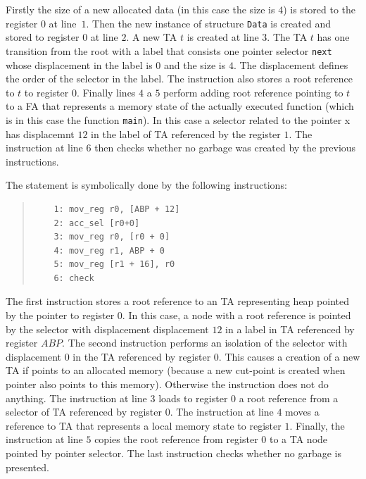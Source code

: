 	Firstly the size of a new allocated data (in this case the size is $4$) is stored to the register $0$ at line~$1$.
	Then the new instance of structure {\tt Data} is created and stored to register $0$ at line $2$.
	A new TA $t$ is created at line $3$.
	The TA $t$ has one transition from the root with a label that consists one pointer selector {\tt next} whose
	displacement in the label is $0$ and the size is $4$.
	The displacement defines the order of the selector in the label.
	The instruction  also stores a root reference to $t$ to register $0$.
	Finally lines $4$ a $5$ perform adding root reference pointing to $t$ to a FA that represents
	a memory state of the actually executed function (which is in this case the function {\tt main}).
	In this case a selector related to the pointer x has displacemnt $12$ in the label of TA referenced by the register $1$.
	The instruction at line $6$ then checks whether no garbage was created by the previous instructions.
\eexmp

\bexmp
	The statement  is symbolically done by the following instructions:
	\begin{quote}
	\begin{verbatim}
	1: mov_reg r0, [ABP + 12]
	2: acc_sel [r0+0]
	3: mov_reg r0, [r0 + 0]
	4: mov_reg r1, ABP + 0
	5: mov_reg [r1 + 16], r0    
	6: check
	\end{verbatim}
	\end{quote}

	The first instruction stores a root reference to an TA representing heap pointed by the  pointer to register $0$.
	In this case, a node with a root reference is pointed by the selector with displacement displacement $12$ in a label in TA referenced by register $ABP$.
	The second instruction performs an isolation of the selector with displacement $0$ in the TA referenced by register $0$.
	This causes a creation of a new TA if  points to an allocated memory (because a new
	cut-point is created when pointer  also points to this memory).
	Otherwise the instruction does not do anything.
	The instruction at line $3$ loads to register $0$ a root reference from a selector of TA referenced by register $0$.
	The instruction at line $4$ moves a reference to TA that represents a local memory state to register $1$.
	Finally, the instruction at line $5$ copies the root reference from register $0$ to
	a TA node pointed by pointer  selector.
	The last instruction checks whether no garbage is presented.
\eexmp

